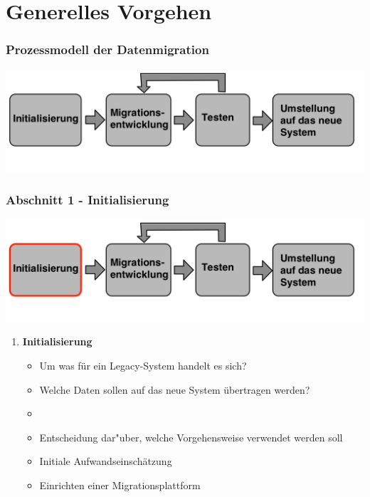 \documentclass{beamer}
\begin{document}
	\section{Generelles Vorgehen}
	
	\begin{frame}
		\frametitle{Prozessmodell der Datenmigration}
				
		\centering
		\includegraphics[width=\textwidth]{../images/prozessmodellt.png}
	\end{frame}
	
	\begin{frame}
		\frametitle{Abschnitt 1 - Initialisierung}
		
		\centering
		\includegraphics[width=\textwidth]{../images/prozessmodell1t.png}\\
	
		
		\begin{enumerate}
			\item \textbf{Initialisierung}
			\begin{itemize}
				\item Um was für ein Legacy-System handelt es sich?
				\item Welche Daten sollen auf das neue System übertragen werden?
				\item[]
				\item Entscheidung dar"uber, welche Vorgehensweise verwendet werden soll
				\item Initiale Aufwandseinschätzung
				\item Einrichten einer Migrationsplattform
			\end{itemize}
		\end{enumerate}
	\end{frame}
	
\end{document}
